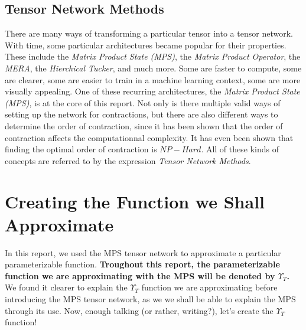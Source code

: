 \documentclass{article}
\theoremstyle{definition}
\theoremstyle{definition}
\begin{document}
\subsection{Tensor Network Methods}
There are many ways of transforming a particular tensor into a tensor network. 
With time, some particular architectures became popular for their properties. These include the \emph{\it Matrix Product State (MPS)}, the \emph{Matrix Product Operator}, the \emph{MERA}, the \emph{Hierchical Tucker}, and much more.
Some are faster to compute, some are clearer, some are easier to train in a machine learning context, some are more visually appealing. One of these recurring architectures, the \emph{\it Matrix Product State (MPS)}, is at the core of this report.
Not only is there multiple valid ways of setting up the network for contractions, but there are also different ways to determine the order of contraction, since it has been shown that the order of contraction affects the computationnal complexity. It has even been shown that finding the optimal order of contraction is $NP-Hard$. All of these kinds of concepts are referred to by the expression \emph{Tensor Network Methods}. 

\section{Creating the Function we Shall Approximate}
In this report, we used the MPS tensor network to approximate a particular parameterizable function.
{\bf Troughout this report, the parameterizable function we are approximating with the MPS will be denoted by $\Upsilon_{T}$. }
We found it clearer to explain the $\Upsilon_{T}$ function we are approximating before introducing the MPS tensor network, as we we shall be able to explain the MPS through its use.
Now, enough talking (or rather, writing?), let's create the $\Upsilon_{T}$ function!
\end{document}
